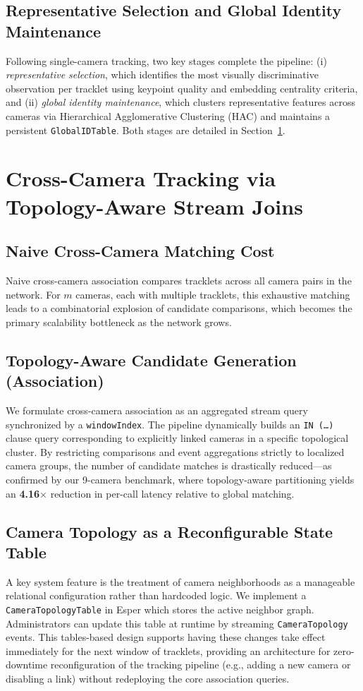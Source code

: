 \documentclass[11pt]{article}
\begin{document}
\subsection{Representative Selection and Global Identity Maintenance}
Following single-camera tracking, two key stages complete the pipeline: (i) \emph{representative selection}, which identifies the most visually discriminative observation per tracklet using keypoint quality and embedding centrality criteria, and (ii) \emph{global identity maintenance}, which clusters representative features across cameras via Hierarchical Agglomerative Clustering (HAC) and maintains a persistent \texttt{GlobalIDTable}. Both stages are detailed in Section~\ref{sec:joins}.

\section{Cross-Camera Tracking via Topology-Aware Stream Joins}\label{sec:joins}
\subsection{Naive Cross-Camera Matching Cost}
Naive cross-camera association compares tracklets across all camera pairs in the network. For $m$ cameras, each with multiple tracklets, this exhaustive matching leads to a combinatorial explosion of candidate comparisons, which becomes the primary scalability bottleneck as the network grows.

\subsection{Topology-Aware Candidate Generation (Association)}
We formulate cross-camera association as an aggregated stream query synchronized by a \texttt{windowIndex}. The pipeline dynamically builds an \texttt{IN (\dots)} clause query corresponding to explicitly linked cameras in a specific topological cluster. By restricting comparisons and event aggregations strictly to localized camera groups, the number of candidate matches is drastically reduced---as confirmed by our 9-camera benchmark, where topology-aware partitioning yields an \textbf{4.16$\times$} reduction in per-call latency relative to global matching.

\subsection{Camera Topology as a Reconfigurable State Table}
A key system feature is the treatment of camera neighborhoods as a manageable relational configuration rather than hardcoded logic. We implement a \texttt{CameraTopologyTable} in Esper which stores the active neighbor graph. Administrators can update this table at runtime by streaming \texttt{CameraTopology} events. This tables-based design supports having these changes take effect immediately for the next window of tracklets, providing an architecture for zero-downtime reconfiguration of the tracking pipeline (e.g., adding a new camera or disabling a link) without redeploying the core association queries.
\end{document}

